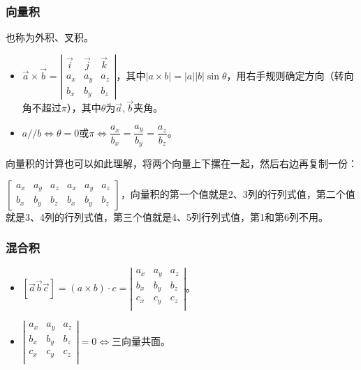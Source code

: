 \documentclass[UTF8, 12pt]{ctexart}
\begin{document}
\subsubsection{向量积}

也称为外积、叉积。

\begin{itemize}
    \item $\vec{a}\times\vec{b}=\left\vert\begin{array}{ccc}
        \vec{i} & \vec{j} & \vec{k} \\
        a_x & a_y & a_z \\
        b_x & b_y & b_z
    \end{array}\right\vert$，其中$\vert a\times b\vert=\vert a\vert\vert b\vert\sin\theta$，用右手规则确定方向（转向角不超过$\pi$），其中$\theta$为$\vec{a},\vec{b}$夹角。
    \item $a//b\Leftrightarrow\theta=0$或$\pi\Leftrightarrow\dfrac{a_x}{b_x}=\dfrac{a_y}{b_y}=\dfrac{a_z}{b_z}$。
\end{itemize}

向量积的计算也可以如此理解，将两个向量上下摞在一起，然后右边再复制一份：

$\left[\begin{array}{cccccc}
    a_x & a_y & a_z & a_x & a_y & a_z \\
    b_x & b_y & b_z & b_x & b_y & b_z
\end{array}\right]$，向量积的第一个值就是2、3列的行列式值，第二个值就是3、4列的行列式值，第三个值就是4、5列行列式值，第1和第6列不用。

\subsubsection{混合积}

\begin{itemize}
    \item $[\vec{a}\vec{b}\vec{c}]=(a\times b)\cdot c=\left\vert\begin{array}{ccc}
        a_x & a_y & a_z \\
        b_x & b_y & b_z \\
        c_x & c_y & c_z \\
    \end{array}\right\vert$。
    \item $\left\vert\begin{array}{ccc}
        a_x & a_y & a_z \\
        b_x & b_y & b_z \\
        c_x & c_y & c_z \\
    \end{array}\right\vert=0\Leftrightarrow$三向量共面。
\end{itemize}
\end{document}
